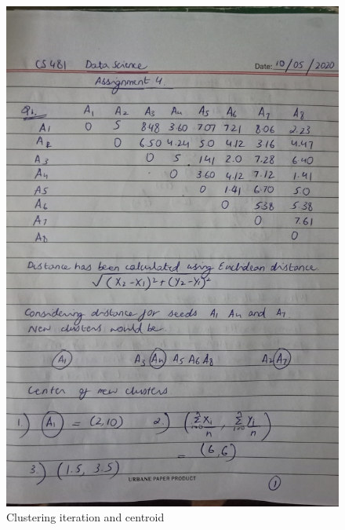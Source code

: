 \documentclass[12pt]{article}
\begin{document}
\begin{figure}
  \includegraphics[width=\linewidth]{1.jpg}
  \caption{Clustering iteration and centroid}
  \label{pic1}
\end{figure}
\end{document}
